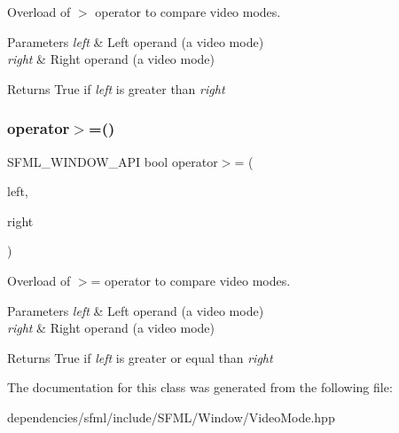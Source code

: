 Overload of $>$ operator to compare video modes. 


\begin{DoxyParams}{Parameters}
{\em left} & Left operand (a video mode) \\
\hline
{\em right} & Right operand (a video mode)\\
\hline
\end{DoxyParams}
\begin{DoxyReturn}{Returns}
True if {\itshape left} is greater than {\itshape right} 
\end{DoxyReturn}
\mbox{\label{classsf_1_1_video_mode_a7f7983e336203d34c9878c77fff60f1f}} 
\subsubsection{\texorpdfstring{operator$>$=()}{operator>=()}}
{\footnotesize\ttfamily S\+F\+M\+L\+\_\+\+W\+I\+N\+D\+O\+W\+\_\+\+A\+PI bool operator$>$= (\begin{DoxyParamCaption}\item[{const \hyperlink{classsf_1_1_video_mode}{Video\+Mode} \&}]{left,  }\item[{const \hyperlink{classsf_1_1_video_mode}{Video\+Mode} \&}]{right }\end{DoxyParamCaption})\hspace{0.3cm}{\ttfamily [related]}}



Overload of $>$= operator to compare video modes. 


\begin{DoxyParams}{Parameters}
{\em left} & Left operand (a video mode) \\
\hline
{\em right} & Right operand (a video mode)\\
\hline
\end{DoxyParams}
\begin{DoxyReturn}{Returns}
True if {\itshape left} is greater or equal than {\itshape right} 
\end{DoxyReturn}


The documentation for this class was generated from the following file\+:\begin{DoxyCompactItemize}
\item 
dependencies/sfml/include/\+S\+F\+M\+L/\+Window/Video\+Mode.\+hpp\end{DoxyCompactItemize}
